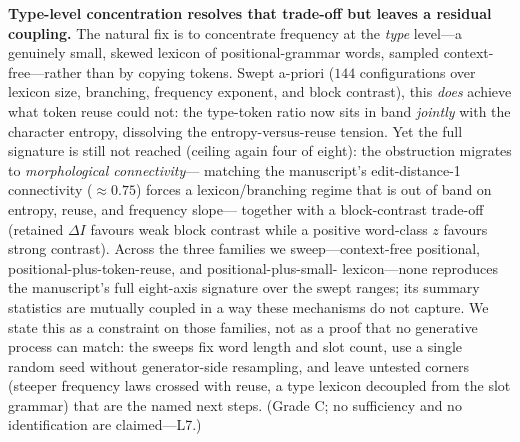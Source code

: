 \documentclass[11pt]{article}
\begin{document}
\textbf{Type-level concentration resolves that trade-off but leaves a residual coupling.}
The natural fix is to concentrate frequency at the \emph{type} level---a genuinely small,
skewed lexicon of positional-grammar words, sampled context-free---rather than by copying
tokens. Swept a-priori ($144$ configurations over lexicon size, branching, frequency
exponent, and block contrast), this \emph{does} achieve what token reuse could not: the
type-token ratio now sits in band \emph{jointly} with the character entropy, dissolving
the entropy-versus-reuse tension. Yet the full signature is still not reached (ceiling
again four of eight): the obstruction migrates to \emph{morphological connectivity}---
matching the manuscript's edit-distance-1 connectivity ($\approx 0.75$) forces a
lexicon/branching regime that is out of band on entropy, reuse, and frequency slope---
together with a block-contrast trade-off (retained $\Delta I$ favours weak block contrast
while a positive word-class $z$ favours strong contrast). Across the three families we
sweep---context-free positional, positional-plus-token-reuse, and positional-plus-small-
lexicon---none reproduces the manuscript's full eight-axis signature over the swept ranges;
its summary statistics are mutually coupled in a way these mechanisms do not capture. We
state this as a constraint on those families, not as a proof that no generative process
can match: the sweeps fix word length and slot count, use a single random seed without
generator-side resampling, and leave untested corners (steeper frequency laws crossed with
reuse, a type lexicon decoupled from the slot grammar) that are the named next steps.
(Grade C; no sufficiency and no identification are claimed---L7.)
\end{document}
